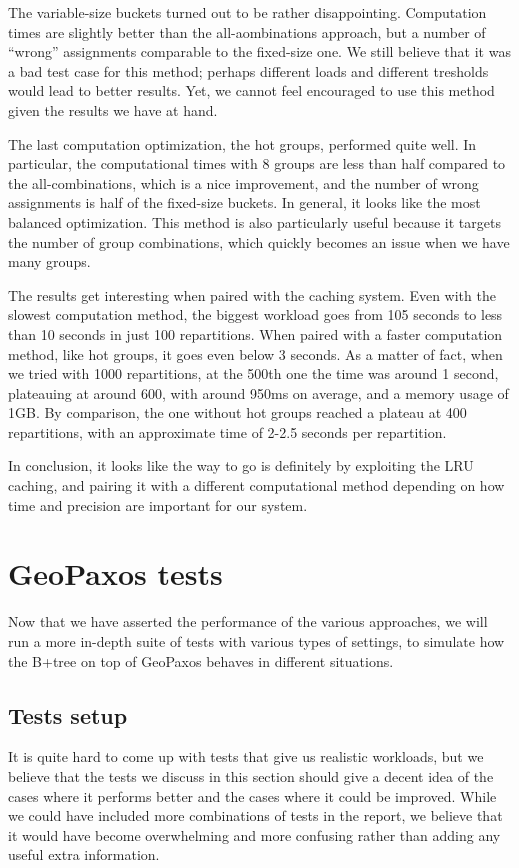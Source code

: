 The variable-size buckets turned out to be rather disappointing. Computation times are slightly better than the all-aombinations approach, but a number of ``wrong'' assignments comparable to the fixed-size one. We still believe that it was a bad test case for this method; perhaps different loads and different tresholds would lead to better results. Yet, we cannot feel encouraged to use this method given the results we have at hand.

The last computation optimization, the hot groups, performed quite well. In particular, the computational times with 8 groups are less than half compared to the all-combinations, which is a nice improvement, and the number of wrong assignments is half of the fixed-size buckets. In general, it looks like the most balanced optimization. This method is also particularly useful because it targets the number of group combinations, which quickly becomes an issue when we have many groups.

The results get interesting when paired with the caching system. Even with the slowest computation method, the biggest workload goes from 105 seconds to less than 10 seconds in just 100 repartitions. When paired with a faster computation method, like hot groups, it goes even below 3 seconds. As a matter of fact, when we tried with 1000 repartitions, at the 500th one the time was around 1 second, plateauing at around 600, with around 950ms on average, and a memory usage of 1GB.
By comparison, the one without hot groups reached a plateau at 400 repartitions, with an approximate time of 2-2.5 seconds per repartition.

In conclusion, it looks like the way to go is definitely by exploiting the LRU caching, and pairing it with a different computational method depending on how time and precision are important for our system.

\chapter{GeoPaxos tests}\label{sec:geopaxos-tests}
Now that we have asserted the performance of the various approaches, we will run a more in-depth suite of tests with various types of settings, to simulate how the B+tree on top of GeoPaxos behaves in different situations.
\section{Tests setup}\label{sec:tests-setup}
It is quite hard to come up with tests that give us realistic workloads, but we believe that the tests we discuss in this section should give a decent idea of the cases where it performs better and the cases where it could be improved. While we could have included more combinations of tests in the report, we believe that it would have become overwhelming and more confusing rather than adding any useful extra information.

